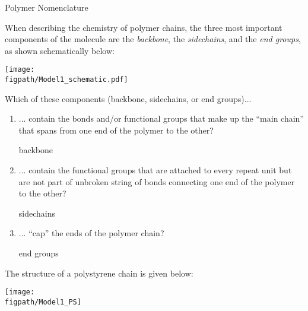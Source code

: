 \begin{activity}{Polymer Nomenclature}
\begin{instructornotes}
\end{instructornotes}


\begin{model}
\label{\labelbase:mdl:backsideend}

	When describing the chemistry of polymer chains, the three most important components of the molecule are the \emph{backbone}, the \emph{sidechains}, and the \emph{end groups}, as shown schematically below:
	
	\centerline{\texttt{[image: \\figpath/Model1\_schematic.pdf]}}

\end{model}


\begin{ctqs}

	\question Which of these components (backbone, sidechains, or end groups)...
	
		\begin{enumerate}
			\item ... contain the bonds and/or functional groups that make up the ``main chain'' that spans from one end of the polymer to the other?
			
				\begin{solution}[0.25in]
					backbone
				\end{solution}
			
			\item ... contain the functional groups that are attached to every repeat unit but are not part of unbroken string of bonds connecting one end of the polymer to the other?
			
				\begin{solution}[0.25in]
					sidechains
				\end{solution}
			
			\item ... ``cap'' the ends of the polymer chain?
			
				\begin{solution}[0.25in]
					end groups
				\end{solution}
				
		\end{enumerate}
		
	\question The structure of a polystyrene chain is given below:
	
		\centerline{\texttt{[image: \\figpath/Model1\_PS]}}
	

\end{ctqs}
\end{activity}
